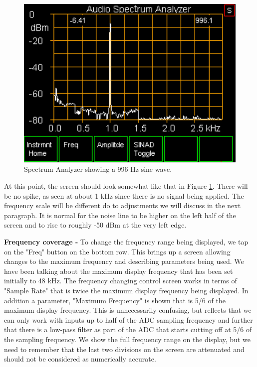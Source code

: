 \begin{figure}[H]
\begin{center}
\includegraphics[scale=0.75]{./images/AVNA_019.pdf}
\caption{Spectrum Analyzer  showing a 996 Hz sine wave.  }
\label{AVNA_019-label}
\end{center}
\end{figure}
%
At this point, the screen should look somewhat like that in Figure \ref{AVNA_019-label}.  There will be no spike, as seen at about 1 kHz since there is no signal being applied.  The frequency scale will be different do to adjustments we will discuss in the next paragraph.  It is normal for the noise line to be higher on the left half of the screen and to rise to roughly -50 dBm at the very left edge.

\textbf{Frequency coverage - }To change the frequency range being displayed, we tap on the "Freq" button on the bottom row.  This brings up a screen allowing changes to the maximum frequency and describing parameters  being used.  We have been talking about the maximum display frequency that has been set initially to 48 kHz.  The frequency changing control screen works in terms of "Sample Rate" that is twice the maximum display frequency being displayed.  In addition a parameter, "Maximum Frequency" is shown that is 5/6 of the maximum display frequency.  This is unnecessarily confusing, but reflects that we can only work with inputs up to half of the ADC sampling frequency and further that there is a low-pass filter as part of the ADC that starts cutting off at 5/6 of the sampling frequency.  We show the full frequency range on the display, but we need to remember that the last two divisions on the screen are attenuated and should not be considered as numerically accurate.

